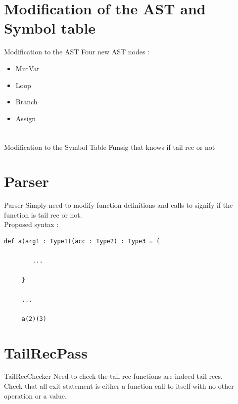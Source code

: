 \documentclass{beamer}
\begin{document}
\section{Modification of the AST and Symbol table}
\begin{frame}{Modification to the AST}
Four new AST nodes :
\begin{itemize}
    \item MutVar
    \item Loop
    \item Branch
    \item Assign
\end{itemize}
\end{frame}

\section{}
\begin{frame}{Modification to the Symbol Table}
    Funsig that knows if tail rec or not
\end{frame}

\section{Parser}
\begin{frame}[fragile]{Parser}
     Simply need to modify function definitions and calls to signify if the function is tail rec or not. \\
     Proposed syntax :
     \begin{lstlisting}[basicstyle=\ttfamily]
     def a(arg1 : Type1)(acc : Type2) : Type3 = {
     
        ...
     
     }
     
     ...
     
     a(2)(3)
     \end{lstlisting}
\end{frame}

\section{TailRecPass}
\begin{frame}{TailRecChecker}
    Need to check the tail rec functions are indeed tail recs.\\
    Check that all exit statement is either a function call to itself with no other operation or a value.
\end{frame}
\end{document}
